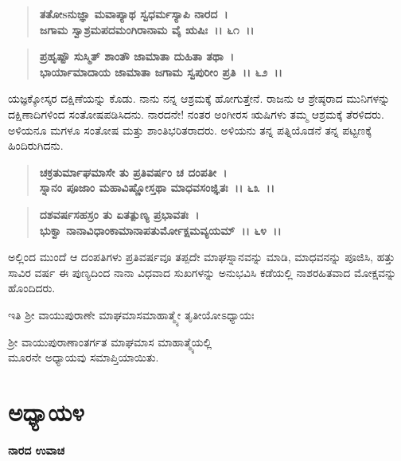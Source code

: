 \begin{verse}
\textbf{ತತೋsನುಜ್ಞಾ ಮವಾಪ್ಯಾಥ ಸ್ವಧರ್ಮಸ್ಯಾಪಿ ನಾರದ~।}\\\textbf{ಜಗಾಮ ಸ್ವಾಶ್ರಮಪದಮಂಗಿರಾನಾಮ ವೈ ಋಷಿಃ~।। ೬೧~।। }
\end{verse}

\begin{verse}
\textbf{ಪ್ರಹೃಷ್ಟೌ ಸುಸ್ಮಿತ್‌ ಶಾಂತೌ ಜಾಮಾತಾ ದುಹಿತಾ ತಥಾ~।}\\\textbf{ಭಾರ್ಯಾಮಾದಾಯ ಜಾಮಾತಾ ಜಗಾಮ ಸ್ವಪುರೀಂ ಪ್ರತಿ~।। ೬೨~।।}
\end{verse}

ಯಜ್ಞಕ್ಕೋಸ್ಕರ ದಕ್ಷಿಣೆಯನ್ನು ಕೊಡು. ನಾನು ನನ್ನ ಆಶ್ರಮಕ್ಕೆ ಹೋಗುತ್ತೇನೆ. ರಾಜನು ಆ ಶ್ರೇಷ್ಠರಾದ ಮುನಿಗಳನ್ನು ದಕ್ಷಿಣಾದಿಗಳಿಂದ ಸಂತೋಷಪಡಿಸಿದನು. ನಾರದನೇ! ನಂತರ ಅಂಗೀರಸ ಋಷಿಗಳು ತಮ್ಮ ಆಶ್ರಮಕ್ಕೆ ತೆರಳಿದರು. ಅಳಿಯನೂ ಮಗಳೂ ಸಂತೋಷ ಮತ್ತು ಶಾಂತಿಭರಿತರಾದರು. ಅಳಿಯನು ತನ್ನ ಪತ್ನಿಯೊಡನೆ ತನ್ನ ಪಟ್ಟಣಕ್ಕೆ ಹಿಂದಿರುಗಿದನು.

\begin{verse}
\textbf{ಚಕ್ರತುರ್ಮಾಘಮಾಸೇ ತು ಪ್ರತಿವರ್ಷಂ ಚ ದಂಪತೀ~।}\\\textbf{ಸ್ನಾನಂ ಪೂಜಾಂ ಮಹಾವಿಷ್ಣೋಸ್ತಥಾ ಮಾಧವಸಂಜ್ಞಿತಃ~।। ೬೩~।। }
\end{verse}

\begin{verse}
\textbf{ದಶವರ್ಷಸಹಸ್ರಂ ತು ಏತತ್ಪುಣ್ಯ ಪ್ರಭಾವತಃ~।}\\\textbf{ಭುಕ್ವಾ ನಾನಾವಿಧಾಂಕಾಮಾನಾಪತುರ್ಮೋಕ್ಷಮವ್ಯಯಮ್~।। ೬೪~।।}
\end{verse}

ಅಲ್ಲಿಂದ ಮುಂದೆ ಆ ದಂಪತಿಗಳು ಪ್ರತಿವರ್ಷವೂ ತಪ್ಪದೇ ಮಾಘಸ್ನಾನವನ್ನು ಮಾಡಿ, ಮಾಧವನನ್ನು ಪೂಜಿಸಿ, ಹತ್ತು ಸಾವಿರ ವರ್ಷ ಈ ಪುಣ್ಯದಿಂದ ನಾನಾ ವಿಧವಾದ ಸುಖಗಳನ್ನು ಅನುಭವಿಸಿ ಕಡೆಯಲ್ಲಿ ನಾಶರಹಿತವಾದ ಮೋಕ್ಷವನ್ನು ಹೊಂದಿದರು.

\begin{center}
ಇತಿ ಶ‍್ರೀ ವಾಯುಪುರಾಣೇ ಮಾಘಮಾಸಮಾಹಾತ್ಮ್ಯೇ ತೃತೀಯೋಽಧ್ಯಾಯಃ
\end{center}

\begin{center}
ಶ‍್ರೀ ವಾಯುಪುರಾಣಾಂತರ್ಗತ ಮಾಘಮಾಸ ಮಾಹಾತ್ಮ್ಯೆಯಲ್ಲಿ \\ ಮೂರನೇ ಅಧ್ಯಾಯವು ಸಮಾಪ್ತಿಯಾಯಿತು.
\end{center}

\newpage

\section*{ಅಧ್ಯಾಯ\enginline{-}೪}

\begin{flushleft}
\textbf{ನಾರದ ಉವಾಚ\enginline{-}}
\end{flushleft}

